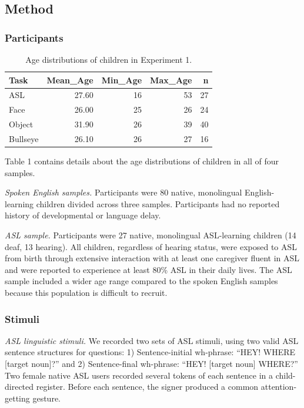 \documentclass[10pt, letterpaper]{article}
\begin{document}
\subsection{Method}\label{method}

\subsubsection{Participants}\label{participants}

\begin{table}[b]
\centering
\begin{tabular}{lrrrr}
  \hline
Task & Mean\_Age & Min\_Age & Max\_Age & n \\ 
  \hline
ASL & 27.60 &  16 &  53 &  27 \\ 
  Face & 26.00 &  25 &  26 &  24 \\ 
  Object & 31.90 &  26 &  39 &  40 \\ 
  Bullseye & 26.10 &  26 &  27 &  16 \\ 
   \hline
\end{tabular}
\caption{Age distributions of children in Experiment 1.} 
\end{table}

Table 1 contains details about the age distributions of children in all
of four samples.

\emph{Spoken English samples.} Participants were 80 native, monolingual
English-learning children divided across three samples. Participants had
no reported history of developmental or language delay.

\emph{ASL sample.} Participants were 27 native, monolingual ASL-learning
children (14 deaf, 13 hearing). All children, regardless of hearing
status, were exposed to ASL from birth through extensive interaction
with at least one caregiver fluent in ASL and were reported to
experience at least 80\% ASL in their daily lives. The ASL sample
included a wider age range compared to the spoken English samples
because this population is difficult to recruit.

\subsubsection{Stimuli}\label{stimuli}

\emph{ASL linguistic stimuli.} We recorded two sets of ASL stimuli,
using two valid ASL sentence structures for questions: 1)
Sentence-initial wh-phrase: ``HEY! WHERE {[}target noun{]}?'' and 2)
Sentence-final wh-phrase: ``HEY! {[}target noun{]} WHERE?'' Two female
native ASL users recorded several tokens of each sentence in a
child-directed register. Before each sentence, the signer produced a
common attention-getting gesture.
\end{document}
